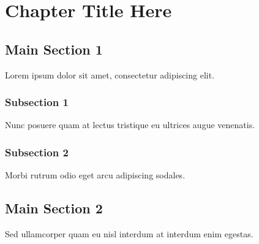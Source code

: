 \chapter{Chapter Title Here}
\label{ChapterX}


\section{Main Section 1}

Lorem ipsum dolor sit amet, consectetur adipiscing elit.

\subsection{Subsection 1}

Nunc posuere quam at lectus tristique eu ultrices augue venenatis.



\subsection{Subsection 2}

Morbi rutrum odio eget arcu adipiscing sodales.

\section{Main Section 2}

Sed ullamcorper quam eu nisl interdum at interdum enim egestas.